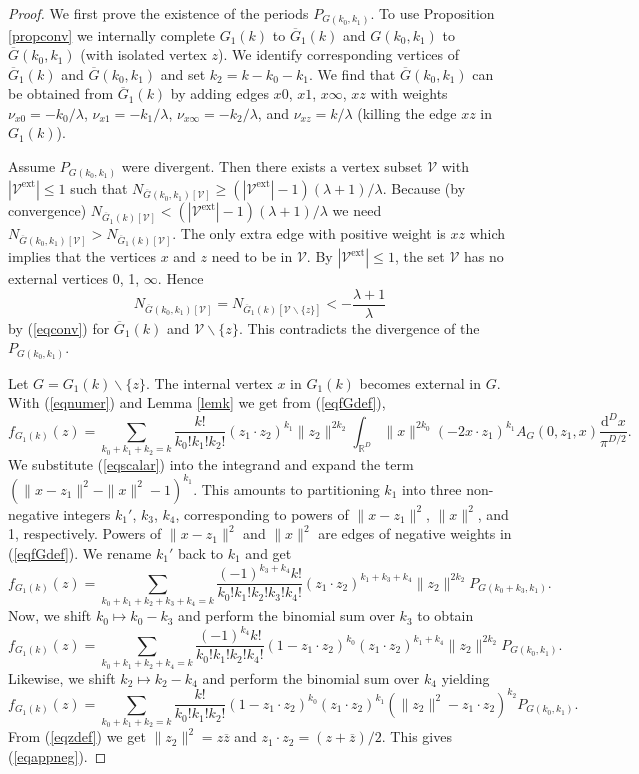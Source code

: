 \documentclass[oneside]{amsart}
\newcommand{\RR}{{\mathbb R}}
\newcommand{\dd}{\mathrm{d}}
\newcommand{\zz}{{\overline{z}}}
\newcommand{\Gg}{{\overline{G}}}
\newcommand{\sV}{\mathcal{V}}
\theoremstyle{plain}
\begin{document}
\begin{proof}
We first prove the existence of the periods $P_{G(k_0,k_1)}$. To use Proposition \ref{propconv} we internally complete $G_1(k)$ to $\Gg_1(k)$ and $G(k_0,k_1)$ to $\Gg(k_0,k_1)$ (with isolated vertex $z$).
We identify corresponding vertices of $\Gg_1(k)$ and $\Gg(k_0,k_1)$ and set $k_2=k-k_0-k_1$.
We find that $\Gg(k_0,k_1)$ can be obtained from $\Gg_1(k)$ by adding edges $x0$, $x1$, $x\infty$, $xz$ with weights $\nu_{x0}=-k_0/\lambda$, $\nu_{x1}=-k_1/\lambda$,
$\nu_{x\infty}=-k_2/\lambda$, and $\nu_{xz}=k/\lambda$ (killing the edge $xz$ in $G_1(k)$).

Assume $P_{G(k_0,k_1)}$ were divergent. Then there exists a vertex subset $\sV$ with $|\sV^\text{ext}|\leq1$ such that $N_{\Gg(k_0,k_1)[\sV]}\geq(|\sV^\text{ext}|-1)(\lambda+1)/\lambda$.
Because (by convergence) $N_{\Gg_1(k)[\sV]}<(|\sV^\text{ext}|-1)(\lambda+1)/\lambda$ we need $N_{\Gg(k_0,k_1)[\sV]}>N_{\Gg_1(k)[\sV]}$. The only extra edge with positive weight is $xz$ which
implies that the vertices $x$ and $z$ need to be in $\sV$. By $|\sV^\text{ext}|\leq1$, the set $\sV$ has no external vertices 0, 1, $\infty$.
Hence
$$
N_{\Gg(k_0,k_1)[\sV]}=N_{\Gg_1(k)[\sV\backslash\{z\}]}<-\frac{\lambda+1}{\lambda}
$$
by (\ref{eqconv}) for $\Gg_1(k)$ and $\sV\backslash\{z\}$. This contradicts the divergence of the $P_{G(k_0,k_1)}$.

Let $G=G_1(k)\backslash\{z\}$. The internal vertex $x$ in $G_1(k)$ becomes external in $G$.
With (\ref{eqnumer}) and Lemma \ref{lemk} we get from (\ref{eqfGdef}),
$$
f_{G_1(k)}(z)=\sum_{k_0+k_1+k_2=k}\frac{k!}{k_0!k_1!k_2!}(z_1\cdot z_2)^{k_1}\|z_2\|^{2k_2}\int_{\RR^D}\|x\|^{2k_0}(-2x\cdot z_1)^{k_1}A_G(0,z_1,x)\frac{\dd^Dx}{\pi^{D/2}}.
$$
We substitute (\ref{eqscalar}) into the integrand and expand the term $(\|x-z_1\|^2-\|x\|^2-1)^{k_1}$. This amounts to partitioning $k_1$ into three non-negative integers
$k_1'$, $k_3$, $k_4$, corresponding to powers of $\|x-z_1\|^2$, $\|x\|^2$, and 1, respectively. Powers of $\|x-z_1\|^2$ and $\|x\|^2$ are edges of negative weights in (\ref{eqfGdef}).
We rename $k_1'$ back to $k_1$ and get
$$
f_{G_1(k)}(z)=\sum_{k_0+k_1+k_2+k_3+k_4=k}\frac{(-1)^{k_3+k_4}k!}{k_0!k_1!k_2!k_3!k_4!}(z_1\cdot z_2)^{k_1+k_3+k_4}\|z_2\|^{2k_2}P_{G(k_0+k_3,k_1)}.
$$
Now, we shift $k_0\mapsto k_0-k_3$ and perform the binomial sum over $k_3$ to obtain
$$
f_{G_1(k)}(z)=\sum_{k_0+k_1+k_2+k_4=k}\frac{(-1)^{k_4}k!}{k_0!k_1!k_2!k_4!}(1-z_1\cdot z_2)^{k_0}(z_1\cdot z_2)^{k_1+k_4}\|z_2\|^{2k_2}P_{G(k_0,k_1)}.
$$
Likewise, we shift $k_2\mapsto k_2-k_4$ and perform the binomial sum over $k_4$ yielding
$$
f_{G_1(k)}(z)=\sum_{k_0+k_1+k_2=k}\frac{k!}{k_0!k_1!k_2!}(1-z_1\cdot z_2)^{k_0}(z_1\cdot z_2)^{k_1}(\|z_2\|^2-z_1\cdot z_2)^{k_2}P_{G(k_0,k_1)}.
$$
From (\ref{eqzdef}) we get $\|z_2\|^2=z\zz$ and $z_1\cdot z_2=(z+\zz)/2$. This gives (\ref{eqappneg}).
\end{proof}
\end{document}

